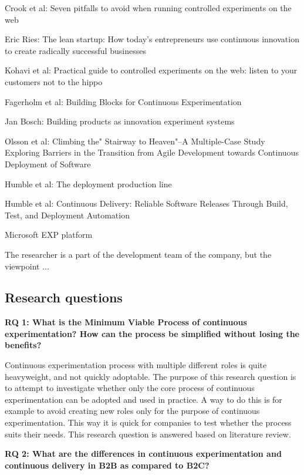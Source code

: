 \documentclass[english]{tktltiki2}
\theoremstyle{definition}
\theoremstyle{remark}
\begin{document}
Crook et al: Seven pitfalls to avoid when running controlled experiments on the web

Eric Ries: The lean startup: How today's entrepreneurs use continuous innovation to create radically successful businesses

Kohavi et al: Practical guide to controlled experiments on the web: listen to your customers not to the hippo

Fagerholm et al: Building Blocks for Continuous Experimentation

Jan Bosch: Building products as innovation experiment systems

Olsson et al: Climbing the" Stairway to Heaven"--A Multiple-Case Study Exploring Barriers in the Transition from Agile Development towards Continuous Deployment of Software

Humble et al: The deployment production line

Humble et al: Continuous Delivery: Reliable Software Releases Through Build, Test, and Deployment Automation

Microsoft EXP platform

The researcher is a part of the development team of the company, but the viewpoint ...

\subsection{Research questions} %
\noindent \textbf{RQ 1: What is the Minimum Viable Process of continuous experimentation? How can the process be simplified without losing the benefits?}

\noindent Continuous experimentation process with multiple different roles is quite heavyweight, and not quickly adoptable. The purpose of this research question is to attempt to investigate whether only the core process of continuous experimentation can be adopted and used in practice. A way to do this is for example to avoid creating new roles only for the purpose of continuous experimentation. This way it is quick for companies to test whether the process suits their needs. This research question is answered based on literature review. \newline

\noindent \textbf{RQ 2: What are the differences in continuous experimentation and continuous delivery in B2B as compared to B2C?}
\end{document}
